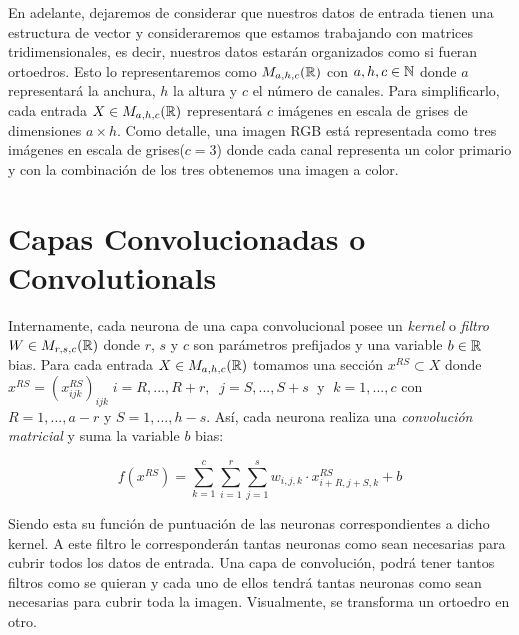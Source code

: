 \begin{itemize}
En adelante, dejaremos de considerar que nuestros datos de entrada tienen una estructura de vector y consideraremos que estamos trabajando con matrices tridimensionales, es decir, nuestros datos estarán organizados como si fueran ortoedros. Esto lo representaremos como $M_{a,h,c}(\mathbb{R})$ con $a,h,c\in \mathbb{N}$ donde $a$ representará la anchura, $h$ la altura y $c$ el número de canales. Para simplificarlo, cada entrada $X\in M_{a,h,c}(\mathbb{R})$ representará $c$ imágenes en escala de grises de dimensiones $a\times h$. Como detalle, una imagen RGB está representada como tres imágenes en escala de grises($c=3$) donde cada canal representa un color primario y con la combinación de los tres obtenemos una imagen a color.

\section{Capas Convolucionadas o Convolutionals}

Internamente, cada neurona de una capa convolucional posee un \emph{kernel} o \emph{filtro} $W\in M_{r,s,c}(\mathbb{R})$ donde $r$, $s$ y $c$ son parámetros prefijados y una variable $b\in\mathbb{R}$ bias. Para cada entrada $X \in M_{a,h,c}(\mathbb{R})$ tomamos una sección $x^{RS} \subset X$ donde $x^{RS}=(x_{ijk}^{RS})_{ijk}\; i=R,...,R+r, \;\; j=S,...,S+s\;$ y $\;k=1,...,c$ con $R=1,...,a-r$ y $S=1,...,h-s$. Así, cada neurona realiza una \emph{convolución matricial} y suma la variable $b$ bias: \newline

$$f(x^{RS})=\sum_{k=1}^{c}\sum_{i=1}^{r} \sum_{j=1}^{s} w_{i,j,k} \cdot x_{i+R,j+S,k}^{RS}+b$$

Siendo esta su función de puntuación de las neuronas correspondientes a dicho kernel. A este filtro le corresponderán tantas neuronas como sean necesarias para cubrir todos los datos de entrada. Una capa de convolución, podrá tener tantos filtros como se quieran y cada uno de ellos tendrá tantas neuronas como sean necesarias para cubrir toda la imagen. Visualmente, se transforma un ortoedro en otro.\newline

\begin{figure}
\centering

\end{figure}
\end{itemize}
